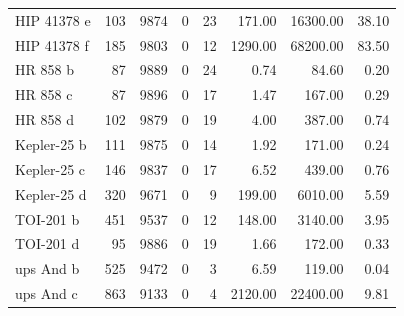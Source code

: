 \begin{table}
\begin{tabular}{lrrrrrrr}
HIP 41378 e & 103 & 9874 & 0 & 23 & 171.00 & 16300.00 & 38.10 \\
HIP 41378 f & 185 & 9803 & 0 & 12 & 1290.00 & 68200.00 & 83.50 \\
HR 858 b & 87 & 9889 & 0 & 24 & 0.74 & 84.60 & 0.20 \\
HR 858 c & 87 & 9896 & 0 & 17 & 1.47 & 167.00 & 0.29 \\
HR 858 d & 102 & 9879 & 0 & 19 & 4.00 & 387.00 & 0.74 \\
Kepler-25 b & 111 & 9875 & 0 & 14 & 1.92 & 171.00 & 0.24 \\
Kepler-25 c & 146 & 9837 & 0 & 17 & 6.52 & 439.00 & 0.76 \\
Kepler-25 d & 320 & 9671 & 0 & 9 & 199.00 & 6010.00 & 5.59 \\
TOI-201 b & 451 & 9537 & 0 & 12 & 148.00 & 3140.00 & 3.95 \\
TOI-201 d & 95 & 9886 & 0 & 19 & 1.66 & 172.00 & 0.33 \\
ups And b & 525 & 9472 & 0 & 3 & 6.59 & 119.00 & 0.04 \\
ups And c & 863 & 9133 & 0 & 4 & 2120.00 & 22400.00 & 9.81 \\
\bottomrule
\end{tabular}
\end{table}

